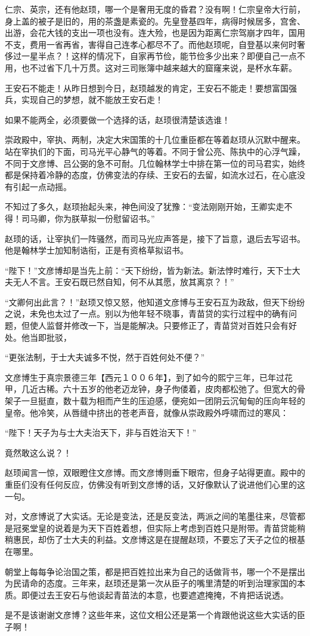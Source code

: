 仁宗、英宗，还有他赵顼，哪一个是奢用无度的昏君？没有啊！仁宗皇帝大行前，身上盖的被子是旧的，用的茶盏是素瓷的。先皇登基四年，病得时候居多，宫舍、出游，会花大钱的支出一项也没有。连大殓，也是因为距离仁宗驾崩才四年，国用不支，费用一省再省，害得自己连孝心都尽不了。而他赵顼呢，自登基以来何时奢侈过一星半点？！这样的情况下，自家再节俭，能节俭多少出来？即便自己一点不用，也不过省下几十万贯。这对三司账簿中越来越大的窟窿来说，是杯水车薪。

王安石不能走！从昨日想到今日，赵顼越发的肯定，王安石不能走！要想富国强兵，实现自己的梦想，就不能放王安石走！

如果不能两全，必须要做一个选择的话，赵顼很清楚该选谁！

崇政殿中，宰执、两制，决定大宋国策的十几位重臣都在等着赵顼从沉默中醒来。站在宰执们的下面，司马光平心静气的等着。不同于曾公亮、陈执中的心浮气躁，不同于文彦博、吕公弼的急不可耐。几位翰林学士中排在第一位的司马君实，始终都是保持着冷静的态度，仿佛变法的存续、王安石的去留，如流水过石，在心底没有引起一点动摇。

不知过了多久，赵顼抬起头来，神色间没了犹豫：“变法刚刚开始，王卿实走不得！司马卿，你为朕草拟一份慰留诏书。”

赵顼的话，让宰执们一阵骚然，而司马光应声答是，接下了旨意，退后去写诏书。他是翰林学士加知制诰衔，正是有资格草拟诏书。

“陛下！”文彦博却是当先上前：“天下纷纷，皆为新法。新法悖时难行，天下士大夫无人不言。王安石既已然自知，何不从其愿，放其离京？！”

“文卿何出此言？！”赵顼又惊又怒，他知道文彦博与王安石互为政敌，但天下纷纷之说，未免也太过了一点。别以为他年轻不晓事，青苗贷的实行过程中的确有问题，但使人监督并修改一下，当是能解决。只要修正了，青苗贷对百姓只会有好处。他当即批驳，

“更张法制，于士大夫诚多不悦，然于百姓何处不便？”

文彦博生于真宗景德三年【西元１００６年】，到了如今的熙宁三年，已年过花甲，几近古稀。六十五岁的他老迈龙钟，身子佝偻着，皮肉都松弛了。但宽大的骨架子一旦挺直，数十载为相而产生的压迫感，便宛如一团阴云沉甸甸的压向年轻的皇帝。他冷笑，从唇缝中挤出的苍老声音，就像从崇政殿外呼啸而过的寒风：

“陛下！天子为与士大夫治天下，非与百姓治天下！”

竟然敢这么说？！

赵顼闻言一惊，双眼瞪住文彦博。而文彦博则垂下眼帘，但身子站得更直。殿中的重臣们没有任何反应，仿佛没有听到文彦博的话，又好像默认了说进他们心里的这一句。

对，文彦博说了大实话。无论是变法，还是反变法，两派之间的笔墨往来，尽管都是冠冕堂皇的说着是为天下百姓着想，但实际上考虑到百姓只是附带。青苗贷能稍稍惠民，却伤了士大夫的利益。文彦博这是在提醒赵顼，不要忘了天子之位的根基在哪里。

朝堂上每每争论治国之策，都是把百姓拉出来为自己的话做背书，哪一个不是摆出为民请命的态度。三年来，赵顼还是第一次从臣子的嘴里清楚的听到治理家国的本质。即便过去王安石与他谈起青苗法的本意，也要遮遮掩掩，不肯把话说透。

是不是该谢谢文彦博？这些年来，这位文相公还是第一个肯跟他说这些大实话的臣子啊！

